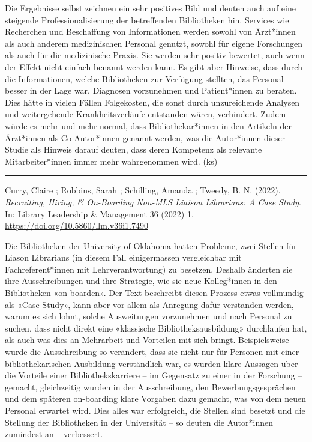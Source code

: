 \documentclass[a4paper,
fontsize=11pt,
oneside,
numbers=noperiodatend,
parskip=half-,
bibliography=totoc,
final
]{scrartcl}
\begin{document}
Die Ergebnisse selbst zeichnen ein sehr positives Bild und deuten auch
auf eine steigende Professionalisierung der betreffenden Bibliotheken
hin. Services wie Recherchen und Beschaffung von Informationen werden
sowohl von Ärzt*innen als auch anderem medizinischen Personal genutzt,
sowohl für eigene Forschungen als auch für die medizinische Praxis. Sie
werden sehr positiv bewertet, auch wenn der Effekt nicht einfach benannt
werden kann. Es gibt aber Hinweise, dass durch die Informationen, welche
Bibliotheken zur Verfügung stellten, das Personal besser in der Lage
war, Diagnosen vorzunehmen und Patient*innen zu beraten. Dies hätte in
vielen Fällen Folgekosten, die sonst durch unzureichende Analysen und
weitergehende Krankheitsverläufe entstanden wären, verhindert. Zudem
würde es mehr und mehr normal, dass Bibliothekar*innen in den Artikeln
der Ärzt*innen als Co-Autor*innen genannt werden, was die Autor*innen
dieser Studie als Hinweis darauf deuten, dass deren Kompetenz als
relevante Mitarbeiter*innen immer mehr wahrgenommen wird. (ks)

\begin{center}\rule{0.5\linewidth}{0.5pt}\end{center}

Curry, Claire ; Robbins, Sarah ; Schilling, Amanda ; Tweedy, B. N.
(2022). \emph{Recruiting, Hiring, \& On-Boarding Non-MLS Liaison
Librarians: A Case Study}. In: Library Leadership \& Management 36
(2022) 1, \url{https://doi.org/10.5860/llm.v36i1.7490}

Die Bibliotheken der University of Oklahoma hatten Probleme, zwei
Stellen für Liason Librarians (in diesem Fall einigermassen vergleichbar
mit Fachreferent*innen mit Lehrverantwortung) zu besetzen. Deshalb
änderten sie ihre Ausschreibungen und ihre Strategie, wie sie neue
Kolleg*innen in den Bibliotheken «on-boarden». Der Text beschreibt
diesen Prozess etwas vollmundig als «Case Study», kann aber vor allem
als Anregung dafür verstanden werden, warum es sich lohnt, solche
Ausweitungen vorzunehmen und nach Personal zu suchen, dass nicht direkt
eine «klassische Bibliotheksausbildung» durchlaufen hat, als auch was
dies an Mehrarbeit und Vorteilen mit sich bringt. Beispielsweise wurde
die Ausschreibung so verändert, dass sie nicht nur für Personen mit
einer bibliothekarischen Ausbildung verständlich war, es wurden klare
Aussagen über die Vorteile einer Bibliothekskarriere -- im Gegensatz zu
einer in der Forschung -- gemacht, gleichzeitig wurden in der
Ausschreibung, den Bewerbungsgesprächen und dem späteren on-boarding
klare Vorgaben dazu gemacht, was von dem neuen Personal erwartet wird.
Dies alles war erfolgreich, die Stellen sind besetzt und die Stellung
der Bibliotheken in der Universität -- so deuten die Autor*innen
zumindest an -- verbessert.
\end{document}
